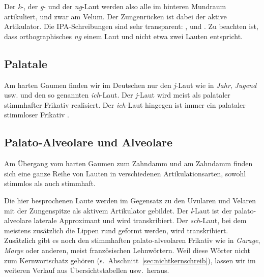 Der \textit{k}-, der \textit{g}- und der \textit{ng}-Laut werden also alle im hinteren Mundraum artikuliert, und zwar am Velum.
Der Zungenrücken ist dabei der aktive Artikulator.
Die IPA-Schreibungen sind sehr transparent: \textipa{[k]}, \textipa{[g]} und \textipa{[N]}.
Zu beachten ist, dass orthographisches \textit{ng} einem Laut und nicht etwa zwei Lauten entspricht.

\subsection{Palatale}


Am harten Gaumen finden wir im Deutschen nur den \textit{j}-Laut wie in \textit{Jahr}, \textit{Jugend} usw. und den so genannten \textit{ich}-Laut.
Der \textit{j}-Laut wird meist als palataler stimmhafter Frikativ \textipa{[J]} realisiert.
Der \textit{ich}-Laut hingegen ist immer ein palataler stimmloser Frikativ \textipa{[\c{c}]}.

\subsection{Palato-Alveolare und Alveolare}


Am Übergang vom harten Gaumen zum Zahndamm und am Zahndamm finden sich eine ganze Reihe von Lauten in verschiedenen Artikulationsarten, sowohl stimmlos als auch stimmhaft.


Die hier besprochenen Laute werden im Gegensatz zu den Uvularen und Velaren mit der Zungenspitze als aktivem Artikulator gebildet.
Der \textit{l}-Laut ist der palato-alveolare laterale Approximant und wird \textipa{[l]} transkribiert.
Der \textit{sch}-Laut, bei dem meistens zusätzlich die Lippen rund geformt werden, wird \textipa{[S]} transkribiert.
Zusätzlich gibt es noch den stimmhaften palato-alveolaren Frikativ \textipa{[Z]} wie in \textit{Garage}, \textit{Marge} oder anderen, meist französischen Lehnwörtern.
Weil diese Wörter nicht zum Kernwortschatz gehören (s.\ Abschnitt~\ref{sec:nichtkernschreib}), lassen wir \textipa{[Z]} im weiteren Verlauf aus Übersichtstabellen usw.\ heraus.

